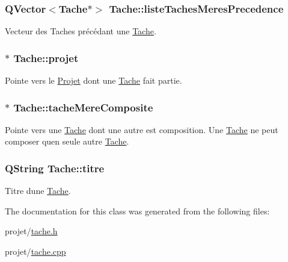 \subsubsection[{liste\+Taches\+Meres\+Precedence}]{\setlength{\rightskip}{0pt plus 5cm}Q\+Vector$<${\bf Tache}$\ast$$>$ Tache\+::liste\+Taches\+Meres\+Precedence\hspace{0.3cm}{\ttfamily [protected]}}\label{class_tache_a0f73920789e27b7c2aeb47d171d5e543}
Vecteur des Taches précédant une \hyperlink{class_tache}{Tache}. \hypertarget{class_tache_a0c6d513a2a376b18cb73ab726fe4dec1}{}
\subsubsection[{projet}]{$\ast$ Tache\+::projet\hspace{0.3cm}{\ttfamily [protected]}}\label{class_tache_a0c6d513a2a376b18cb73ab726fe4dec1}
Pointe vers le \hyperlink{class_projet}{Projet} dont une \hyperlink{class_tache}{Tache} fait partie. \hypertarget{class_tache_a62e6fe2722630c7bdf9a4a6a42364a19}{}
\subsubsection[{tache\+Mere\+Composite}]{$\ast$ Tache\+::tache\+Mere\+Composite\hspace{0.3cm}{\ttfamily [protected]}}\label{class_tache_a62e6fe2722630c7bdf9a4a6a42364a19}
Pointe vers une \hyperlink{class_tache}{Tache} dont une autre est composition. Une \hyperlink{class_tache}{Tache} ne peut composer qu\textquotesingle{}en seule autre \hyperlink{class_tache}{Tache}. \hypertarget{class_tache_a1d3d20046c0c4cc8482f71bb555b79cf}{}
\subsubsection[{titre}]{\setlength{\rightskip}{0pt plus 5cm}Q\+String Tache\+::titre\hspace{0.3cm}{\ttfamily [protected]}}\label{class_tache_a1d3d20046c0c4cc8482f71bb555b79cf}
Titre d\textquotesingle{}une \hyperlink{class_tache}{Tache}. 

The documentation for this class was generated from the following files\+:\begin{DoxyCompactItemize}
\item 
projet/\hyperlink{tache_8h}{tache.\+h}\item 
projet/\hyperlink{tache_8cpp}{tache.\+cpp}\end{DoxyCompactItemize}
